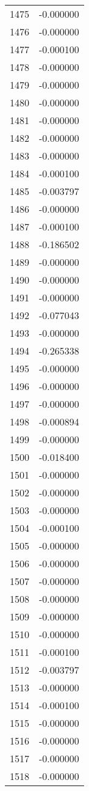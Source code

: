 \documentclass[12pt]{article}
\begin{document}
\begin{longtable}{@{}cc@{}}
1475 & -0.000000 \\
1476 & -0.000000 \\
1477 & -0.000100 \\
1478 & -0.000000 \\
1479 & -0.000000 \\
1480 & -0.000000 \\
1481 & -0.000000 \\
1482 & -0.000000 \\
1483 & -0.000000 \\
1484 & -0.000100 \\
1485 & -0.003797 \\
1486 & -0.000000 \\
1487 & -0.000100 \\
1488 & -0.186502 \\
1489 & -0.000000 \\
1490 & -0.000000 \\
1491 & -0.000000 \\
1492 & -0.077043 \\
1493 & -0.000000 \\
1494 & -0.265338 \\
1495 & -0.000000 \\
1496 & -0.000000 \\
1497 & -0.000000 \\
1498 & -0.000894 \\
1499 & -0.000000 \\
1500 & -0.018400 \\
1501 & -0.000000 \\
1502 & -0.000000 \\
1503 & -0.000000 \\
1504 & -0.000100 \\
1505 & -0.000000 \\
1506 & -0.000000 \\
1507 & -0.000000 \\
1508 & -0.000000 \\
1509 & -0.000000 \\
1510 & -0.000000 \\
1511 & -0.000100 \\
1512 & -0.003797 \\
1513 & -0.000000 \\
1514 & -0.000100 \\
1515 & -0.000000 \\
1516 & -0.000000 \\
1517 & -0.000000 \\
1518 & -0.000000 \\

\end{longtable}
\end{document}
